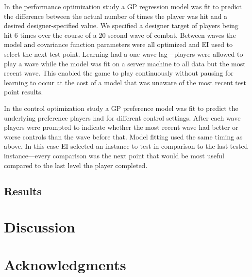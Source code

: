 \documentclass[letterpaper]{article}
\begin{document}
In the performance optimization study a GP regression model was fit to predict the difference between the actual number of times the player was hit and a desired designer-specified value. We specified a designer target of players being hit 6 times over the course of a 20 second wave of combat. Between waves the model and covariance function parameters were all optimized and EI used to select the next test point.
Learning had a one wave lag---players were allowed to play a wave while the model was fit on a server machine to all data but the most recent wave. This enabled the game to play continuously without pausing for learning to occur at the cost of a model that was unaware of the most recent test point results.

In the control optimization study a GP preference model was fit to predict the underlying preference players had for different control settings. After each wave players were prompted to indicate whether the most recent wave had better or worse controls than the wave before that. Model fitting used the same timing as above. In this case EI selected an instance to test in comparison to the last tested instance---every comparison was the next point that would be most useful compared to the last level the player completed.



\subsection{Results}



\section{Discussion}







\section{Acknowledgments}



\end{document}
